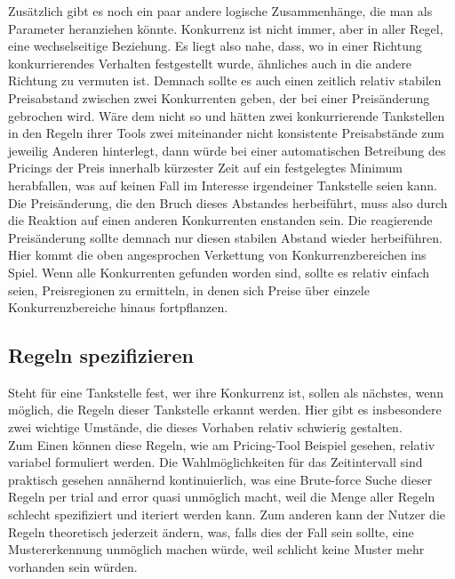 \documentclass[12pt,a4paper,bibliography=totocnumbered,listof=totocnumbered]{scrartcl}
\begin{document}
Zusätzlich gibt es noch ein paar andere logische Zusammenhänge, die man als Parameter heranziehen könnte. Konkurrenz ist nicht immer, aber in aller Regel, eine wechselseitige Beziehung. Es liegt also nahe, dass, wo in einer Richtung konkurrierendes Verhalten festgestellt wurde, ähnliches auch in die andere Richtung zu vermuten ist. Demnach sollte es auch einen zeitlich relativ stabilen Preisabstand zwischen zwei Konkurrenten geben, der bei einer Preisänderung gebrochen wird. Wäre dem nicht so und hätten zwei konkurrierende Tankstellen in den Regeln ihrer Tools zwei miteinander nicht konsistente Preisabstände zum jeweilig Anderen hinterlegt, dann würde bei einer automatischen Betreibung des Pricings der Preis innerhalb kürzester Zeit auf ein festgelegtes Minimum herabfallen, was auf keinen Fall im Interesse irgendeiner Tankstelle seien kann. Die Preisänderung, die den Bruch dieses Abstandes herbeiführt, muss also durch die Reaktion auf einen anderen Konkurrenten enstanden sein. Die reagierende Preisänderung sollte demnach nur diesen stabilen Abstand wieder herbeiführen. Hier kommt die oben angesprochen Verkettung von Konkurrenzbereichen ins Spiel. Wenn alle Konkurrenten gefunden worden sind, sollte es relativ einfach seien, Preisregionen zu ermitteln, in denen sich Preise über einzele Konkurrenzbereiche hinaus fortpflanzen.

\subsection{Regeln spezifizieren}

Steht für eine Tankstelle fest, wer ihre Konkurrenz ist, sollen als nächstes, wenn möglich, die Regeln dieser Tankstelle erkannt werden. Hier gibt es insbesondere zwei wichtige Umstände, die dieses Vorhaben relativ schwierig gestalten.\\

Zum Einen können diese Regeln, wie am Pricing-Tool Beispiel gesehen, relativ variabel formuliert werden. Die Wahlmöglichkeiten für das Zeitintervall sind praktisch gesehen annähernd kontinuierlich, was eine Brute-force Suche dieser Regeln per trial and error quasi unmöglich macht, weil die Menge aller Regeln schlecht spezifiziert und iteriert werden kann. Zum anderen kann der Nutzer die Regeln theoretisch jederzeit ändern, was, falls dies der Fall sein sollte, eine Mustererkennung unmöglich machen würde, weil schlicht keine Muster mehr vorhanden sein würden.\\
\end{document}
